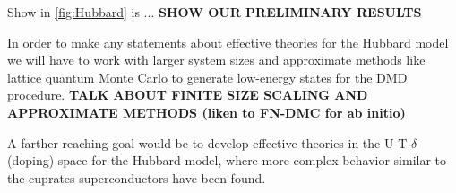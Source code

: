 \documentclass{article}
\begin{document}
Show in \ref{fig:Hubbard} is ... \textbf{SHOW OUR PRELIMINARY RESULTS}

In order to make any statements about effective theories for the Hubbard model we will have to work with larger system sizes and approximate methods like lattice quantum Monte Carlo to generate low-energy states for the DMD procedure. \textbf{TALK ABOUT FINITE SIZE SCALING AND APPROXIMATE METHODS (liken to FN-DMC for ab initio)}

A farther reaching goal would be to develop effective theories in the U-T-$\delta$ (doping) space for the Hubbard model, where more complex behavior similar to the cuprates superconductors have been found.
\end{document}

